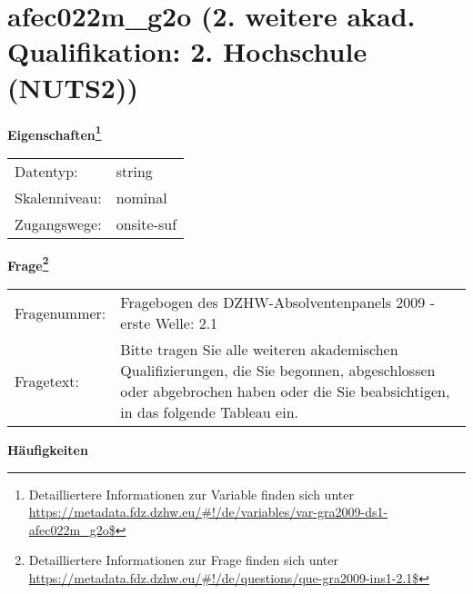 
    \setcounter{footnote}{0}

    \vspace*{-1.8cm}
	\section{afec022m\_g2o (2. weitere akad. Qualifikation: 2. Hochschule (NUTS2))}
	\label{section:afec022m_g2o}



    \vspace*{0.5cm}
    \noindent\textbf{Eigenschaften\footnote{Detailliertere Informationen zur Variable finden sich unter
		\url{https://metadata.fdz.dzhw.eu/\#!/de/variables/var-gra2009-ds1-afec022m_g2o$}}}\\
	\begin{tabularx}{\hsize}{@{}lX}
	Datentyp: & string \\
	Skalenniveau: & nominal \\
	Zugangswege: &
	  onsite-suf
 \\
    \end{tabularx}



				\vspace*{0.5cm}
                \noindent\textbf{Frage\footnote{Detailliertere Informationen zur Frage finden sich unter
		              \url{https://metadata.fdz.dzhw.eu/\#!/de/questions/que-gra2009-ins1-2.1$}}}\\
				\begin{tabularx}{\hsize}{@{}lX}
					Fragenummer: &
					  Fragebogen des DZHW-Absolventenpanels 2009 - erste Welle:
					  2.1
 \\
					Fragetext: & Bitte tragen Sie alle weiteren akademischen Qualifizierungen, die Sie begonnen, abgeschlossen oder abgebrochen haben oder die Sie beabsichtigen, in das folgende Tableau ein. \\
				\end{tabularx}





        		\vspace*{0.5cm}
                \noindent\textbf{Häufigkeiten}

